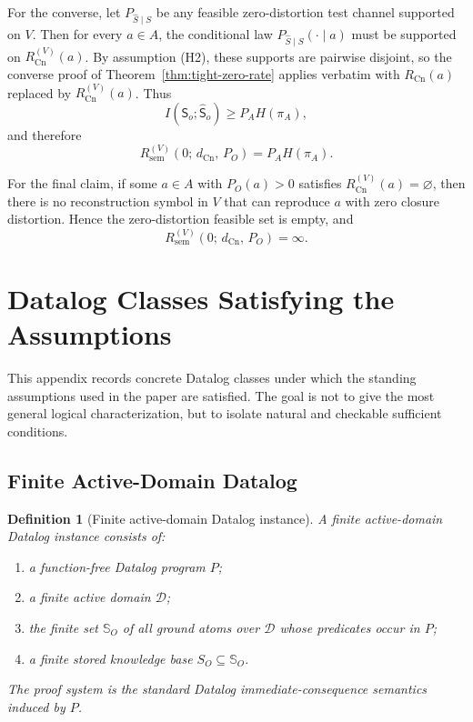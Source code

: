 \documentclass[journal,onecolumn]{IEEEtran}
\makeatletter
\newcommand{\Cn}{\text{Cn}}
\newtheorem{definition}{Definition}[section]
\numberwithin{equation}{section}
\renewenvironment{proof}[1][\proofname]{\par
  \pushQED{\qed}%
  \normalfont \topsep6\p@\@plus6\p@\relax
  \trivlist
  \item[\hskip\labelsep
        \itshape
    #1\@addpunct{.}]\ignorespaces
}{%
  \popQED\endtrivlist\@endpefalse
}
\makeatother
\begin{document}
\begin{proof}
For the converse, let \(P_{\hat S\mid S}\) be any feasible
zero-distortion test channel supported on \(V\).
Then for every \(a\in A\), the conditional law
\(P_{\hat S\mid S}(\cdot\mid a)\) must be supported on
\(R_{\Cn}^{(V)}(a)\).
By assumption \textup{(H2)}, these supports are pairwise disjoint, so
the converse proof of Theorem~\ref{thm:tight-zero-rate} applies
verbatim with \(R_{\Cn}(a)\) replaced by \(R_{\Cn}^{(V)}(a)\).
Thus
\[
  I({\mathsf{S}}_o;\hat {\mathsf{S}}_o)\ge P_AH(\pi_A),
\]
and therefore
\[
  R_{\mathrm{sem}}^{(V)}(0;\,d_{\Cn},\,P_O)=P_AH(\pi_A).
\]

For the final claim, if some \(a\in A\) with \(P_O(a)>0\) satisfies
\(R_{\Cn}^{(V)}(a)=\varnothing\), then there is no reconstruction
symbol in \(V\) that can reproduce \(a\) with zero closure
distortion.
Hence the zero-distortion feasible set is empty, and
\[
  R_{\mathrm{sem}}^{(V)}(0;\,d_{\Cn},\,P_O)=\infty.
\]
\end{proof}

\section{Datalog Classes Satisfying the Assumptions}
\label{app:datalog-classes}

This appendix records concrete Datalog classes under which the
standing assumptions used in the paper are satisfied.
The goal is not to give the most general logical characterization,
but to isolate natural and checkable sufficient conditions.

\subsection{Finite Active-Domain Datalog}
\label{app:datalog-basic}

\begin{definition}[Finite active-domain Datalog instance]
\label{def:finite-active-domain-datalog}
A \emph{finite active-domain Datalog instance} consists of:
\begin{enumerate}[label=\textup{(\roman*)}]
  \item a function-free Datalog program \(P\);
  \item a finite active domain \(\mathcal D\);
  \item the finite set \(\mathbb{S}_O\) of all ground atoms over
        \(\mathcal D\) whose predicates occur in \(P\);
  \item a finite stored knowledge base \(S_O\subseteq\mathbb{S}_O\).
\end{enumerate}
The proof system is the standard Datalog immediate-consequence
semantics induced by \(P\).
\end{definition}
\end{document}
